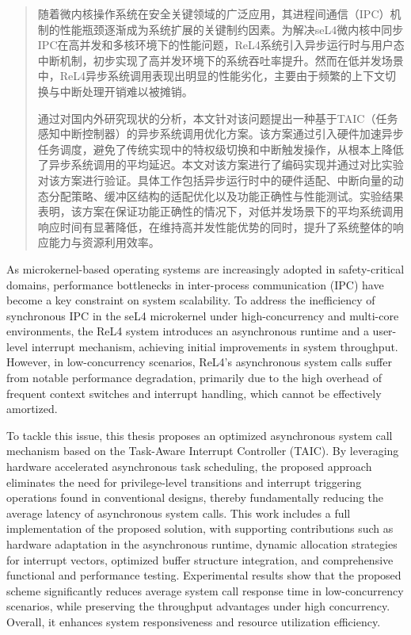 \begin{abstract}

随着微内核操作系统在安全关键领域的广泛应用，其进程间通信（IPC）机制的性能瓶颈逐渐成为系统扩展的关键制约因素。为解决seL4微内核中同步IPC在高并发和多核环境下的性能问题，ReL4系统引入异步运行时与用户态中断机制，初步实现了高并发环境下的系统吞吐率提升。然而在低并发场景中，ReL4异步系统调用表现出明显的性能劣化，主要由于频繁的上下文切换与中断处理开销难以被摊销。

通过对国内外研究现状的分析，本文针对该问题提出一种基于TAIC（任务感知中断控制器）的异步系统调用优化方案。该方案通过引入硬件加速异步任务调度，避免了传统实现中的特权级切换和中断触发操作，从根本上降低了异步系统调用的平均延迟。本文对该方案进行了编码实现并通过对比实验对该方案进行验证。具体工作包括异步运行时中的硬件适配、中断向量的动态分配策略、缓冲区结构的适配优化以及功能正确性与性能测试。实验结果表明，该方案在保证功能正确性的情况下，对低并发场景下的平均系统调用响应时间有显著降低，在维持高并发性能优势的同时，提升了系统整体的响应能力与资源利用效率。

\end{abstract}


\begin{abstractEn}
As microkernel-based operating systems are increasingly adopted in safety-critical domains, performance bottlenecks in inter-process communication (IPC) have become a key constraint on system scalability. To address the inefficiency of synchronous IPC in the seL4 microkernel under high-concurrency and multi-core environments, the ReL4 system introduces an asynchronous runtime and a user-level interrupt mechanism, achieving initial improvements in system throughput. However, in low-concurrency scenarios, ReL4’s asynchronous system calls suffer from notable performance degradation, primarily due to the high overhead of frequent context switches and interrupt handling, which cannot be effectively amortized.

To tackle this issue, this thesis proposes an optimized asynchronous system call mechanism based on the Task-Aware Interrupt Controller (TAIC). By leveraging hardware accelerated asynchronous task scheduling, the proposed approach eliminates the need for privilege-level transitions and interrupt triggering operations found in conventional designs, thereby fundamentally reducing the average latency of asynchronous system calls. This work includes a full implementation of the proposed solution, with supporting contributions such as hardware adaptation in the asynchronous runtime, dynamic allocation strategies for interrupt vectors, optimized buffer structure integration, and comprehensive functional and performance testing. Experimental results show that the proposed scheme significantly reduces average system call response time in low-concurrency scenarios, while preserving the throughput advantages under high concurrency. Overall, it enhances system responsiveness and resource utilization efficiency.

\end{abstractEn}
